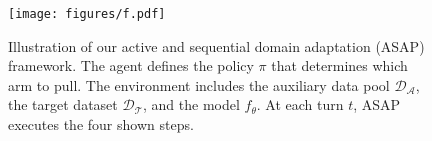 \begin{figure}
    \vspace{-0.1cm}
    \centering
    \texttt{[image: figures/f.pdf]}
    \vspace{-0.5cm}
    \caption{Illustration of our active and sequential domain adaptation (ASAP) framework.
    The agent defines the policy $\pi$ that determines which arm to pull. The environment includes the auxiliary data pool $\mathcal{D}_\mathcal{A}$, the target dataset $\mathcal{D}_\mathcal{T}$, and the model $f_\theta$. At each turn $t$, ASAP executes the four shown steps.
    }
    \label{framework}
    \vspace{-0.2cm}
\end{figure}